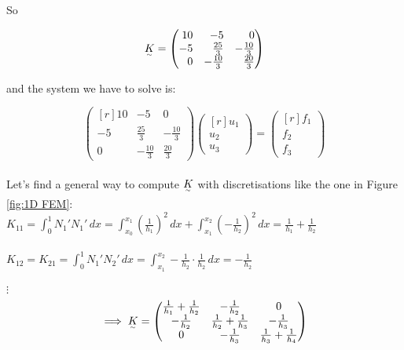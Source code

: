 \begin{example}
So 

\[
  \subTilde{K} =
  \begin{pmatrix*}[r]
    10 & -5            & 0\\
    -5 & \frac{25}{3}  & -\frac{10}{3}\\
    0  & -\frac{10}{3} & \frac{20}{3}
  \end{pmatrix*}
\]

and the system we have to solve is:

\[
  \begin{pmatrix*}[r]
    10 & -5            & 0\\
    -5 & \frac{25}{3}  & -\frac{10}{3}\\
    0  & -\frac{10}{3} & \frac{20}{3}
  \end{pmatrix*}
  \begin{pmatrix*}[r]
    u_1\\ u_2 \\ u_3
  \end{pmatrix*} =
  \begin{pmatrix*}[r]
    f_1\\f_2\\f_3
  \end{pmatrix*}
\]\-\\
Let's find a general way to compute $\underset{^\sim}{K}$ with discretisations like the one in Figure \ref{fig:1D FEM}:\\

$\displaystyle{K_{11} = \int_0^1 N_1'N_1' \, dx = \int_{x_0}^{x_1} \left(\frac{1}{h_1}\right)^2\,dx + \int_{x_1}^{x_2} \left(-\frac{1}{h_2}\right)^2\,dx = \frac{1}{h_1} + \frac{1}{h_2}}$ \\\-\\
$\displaystyle{K_{12} = K_{21} = \int_0^1 N_1'N_2' \, dx = \int_{x_1}^{x_2} -\frac{1}{h_2}\cdot \frac{1}{h_2}\,dx = -\frac{1}{h_2}}$ \\\-\\
$\vdots$\\
\[
  \implies 
  \subTilde{K} =
  \begin{pmatrix*}[c]
    \frac{1}{h_1} + \frac{1}{h_2} & -\frac{1}{h_2}                 & 0                             \\
    -\frac{1}{h_2}                & \frac{1}{h_2} + \frac{1}{h_3}  & -\frac{1}{h_3}                \\
    0                             & -\frac{1}{h_3}                 & \frac{1}{h_3} + \frac{1}{h_4}
  \end{pmatrix*}
\]\-\\


\end{example}
